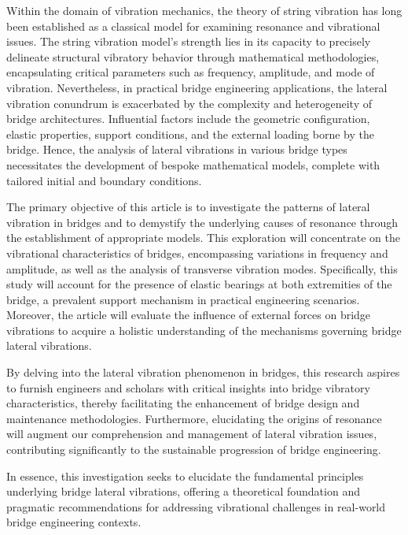 \documentclass[conference]{IEEEtran}
\begin{document}
Within the domain of vibration mechanics, the theory of string vibration has long been established as a classical model for examining resonance and vibrational issues. The string vibration model's strength lies in its capacity to precisely delineate structural vibratory behavior through mathematical methodologies, encapsulating critical parameters such as frequency, amplitude, and mode of vibration. Nevertheless, in practical bridge engineering applications, the lateral vibration conundrum is exacerbated by the complexity and heterogeneity of bridge architectures. Influential factors include the geometric configuration, elastic properties, support conditions, and the external loading borne by the bridge.\cite{fujino2019research} Hence, the analysis of lateral vibrations in various bridge types necessitates the development of bespoke mathematical models, complete with tailored initial and boundary conditions.

The primary objective of this article is to investigate the patterns of lateral vibration in bridges and to demystify the underlying causes of resonance through the establishment of appropriate models. This exploration will concentrate on the vibrational characteristics of bridges, encompassing variations in frequency and amplitude, as well as the analysis of transverse vibration modes. Specifically, this study will account for the presence of elastic bearings at both extremities of the bridge, a prevalent support mechanism in practical engineering scenarios. Moreover, the article will evaluate the influence of external forces on bridge vibrations to acquire a holistic understanding of the mechanisms governing bridge lateral vibrations.

By delving into the lateral vibration phenomenon in bridges, this research aspires to furnish engineers and scholars with critical insights into bridge vibratory characteristics, thereby facilitating the enhancement of bridge design and maintenance methodologies. Furthermore, elucidating the origins of resonance will augment our comprehension and management of lateral vibration issues, contributing significantly to the sustainable progression of bridge engineering.

In essence, this investigation seeks to elucidate the fundamental principles underlying bridge lateral vibrations, offering a theoretical foundation and pragmatic recommendations for addressing vibrational challenges in real-world bridge engineering contexts.
\end{document}

